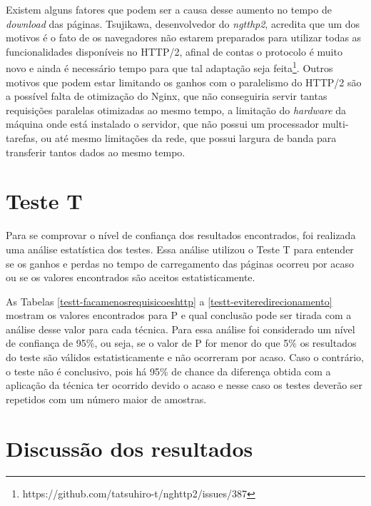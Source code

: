 Existem alguns fatores que podem ser a causa desse aumento no tempo de \textit{download} das páginas. Tsujikawa, desenvolvedor do \textit{ngtthp2}, acredita que um dos motivos é o fato de os navegadores não estarem preparados para utilizar todas as funcionalidades disponíveis no HTTP/2, afinal de contas o protocolo é muito novo e ainda é necessário tempo para que tal adaptação seja feita\footnote{https://github.com/tatsuhiro-t/nghttp2/issues/387}. Outros motivos que podem estar limitando os ganhos com o paralelismo do HTTP/2 são a possível falta de otimização do Nginx, que não conseguiria servir tantas requisições paralelas otimizadas ao mesmo tempo, a limitação do \textit{hardware} da máquina onde está instalado o servidor, que não possui um processador multi-tarefas, ou até mesmo limitações da rede, que possui largura de banda para transferir tantos dados ao mesmo tempo.

\section{Teste T}
\label{testet}

Para se comprovar o nível de confiança dos resultados encontrados, foi realizada uma análise estatística dos testes. Essa análise utilizou o Teste T para entender se os ganhos e perdas no tempo de carregamento das páginas ocorreu por acaso ou se os valores encontrados são aceitos estatisticamente.

As Tabelas \ref{testt-facamenosrequisicoeshttp} a \ref{testt-eviteredirecionamento} mostram os valores encontrados para P e qual conclusão pode ser tirada com a análise desse valor para cada técnica. Para essa análise foi considerado um nível de confiança de 95\%, ou seja, se o valor de P for menor do que 5\% os resultados do teste são válidos estatisticamente e não ocorreram por acaso. Caso o contrário, o teste não é conclusivo, pois há 95\% de chance da diferença obtida com a aplicação da técnica ter ocorrido devido o acaso e nesse caso os testes deverão ser repetidos com um número maior de amostras.






\section{Discussão dos resultados}
\label{discussaodosresultados}

